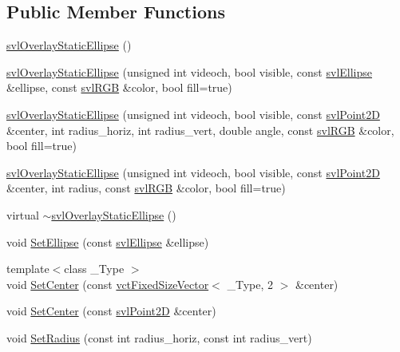 \subsection*{Public Member Functions}
\begin{DoxyCompactItemize}
\item 
\hyperlink{classsvl_overlay_static_ellipse_a884b98b6b03bed60790af58c68f0c363}{svl\+Overlay\+Static\+Ellipse} ()
\item 
\hyperlink{classsvl_overlay_static_ellipse_a9afdc5b5a1f0400099a659660926aef5}{svl\+Overlay\+Static\+Ellipse} (unsigned int videoch, bool visible, const \hyperlink{structsvl_ellipse}{svl\+Ellipse} \&ellipse, const \hyperlink{structsvl_r_g_b}{svl\+R\+G\+B} \&color, bool fill=true)
\item 
\hyperlink{classsvl_overlay_static_ellipse_a5b282488e36c1dc6d9d140e0770150c5}{svl\+Overlay\+Static\+Ellipse} (unsigned int videoch, bool visible, const \hyperlink{structsvl_point2_d}{svl\+Point2\+D} \&center, int radius\+\_\+horiz, int radius\+\_\+vert, double angle, const \hyperlink{structsvl_r_g_b}{svl\+R\+G\+B} \&color, bool fill=true)
\item 
\hyperlink{classsvl_overlay_static_ellipse_aa53ae4f6a5c98ddcf8b463ef5b89b2d1}{svl\+Overlay\+Static\+Ellipse} (unsigned int videoch, bool visible, const \hyperlink{structsvl_point2_d}{svl\+Point2\+D} \&center, int radius, const \hyperlink{structsvl_r_g_b}{svl\+R\+G\+B} \&color, bool fill=true)
\item 
virtual \hyperlink{classsvl_overlay_static_ellipse_acf12035efb076d7b7c666e775e0c34ff}{$\sim$svl\+Overlay\+Static\+Ellipse} ()
\item 
void \hyperlink{classsvl_overlay_static_ellipse_a0122c9922e2738099a3797f84195959e}{Set\+Ellipse} (const \hyperlink{structsvl_ellipse}{svl\+Ellipse} \&ellipse)
\item 
{\footnotesize template$<$class \+\_\+\+Type $>$ }\\void \hyperlink{classsvl_overlay_static_ellipse_a11ad25f81cc32c28a7dd7431fe152c2f}{Set\+Center} (const \hyperlink{classvct_fixed_size_vector}{vct\+Fixed\+Size\+Vector}$<$ \+\_\+\+Type, 2 $>$ \&center)
\item 
void \hyperlink{classsvl_overlay_static_ellipse_a27a3f68ac86f3d1ad340622e6b142dbd}{Set\+Center} (const \hyperlink{structsvl_point2_d}{svl\+Point2\+D} \&center)
\item 
void \hyperlink{classsvl_overlay_static_ellipse_a47bf7f6a2010e9ccbb83382f2555fd13}{Set\+Radius} (const int radius\+\_\+horiz, const int radius\+\_\+vert)

\end{DoxyCompactItemize}
